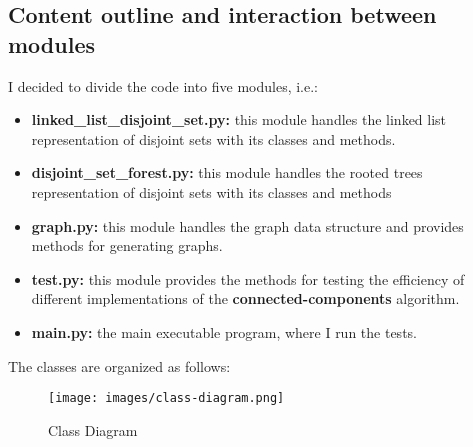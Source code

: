 \documentclass[11pt]{article}
\begin{document}
    \subsection{Content outline and interaction between modules}
    I decided to divide the code into five modules, i.e.:
    \begin{itemize}
        \item \textbf{linked\_list\_disjoint\_set.py:} this module handles the linked list representation of disjoint sets with its classes and methods.
        \item \textbf{disjoint\_set\_forest.py:} this module handles the rooted trees representation of disjoint sets with its classes and methods
        \item \textbf{graph.py:} this module handles the graph data structure and provides methods for generating graphs. 
        \item \textbf{test.py:} this module provides the methods for testing the efficiency of different implementations of the \textbf{connected-components} algorithm.
        \item \textbf{main.py:} the main executable program, where I run the tests.
    \end{itemize}
    The classes are organized as follows:
    \begin{figure}[H]
        \centering
        \texttt{[image: images/class-diagram.png]}
        \caption{Class Diagram}
        \label{fig:class-diagram}
    \end{figure}
\end{document}
